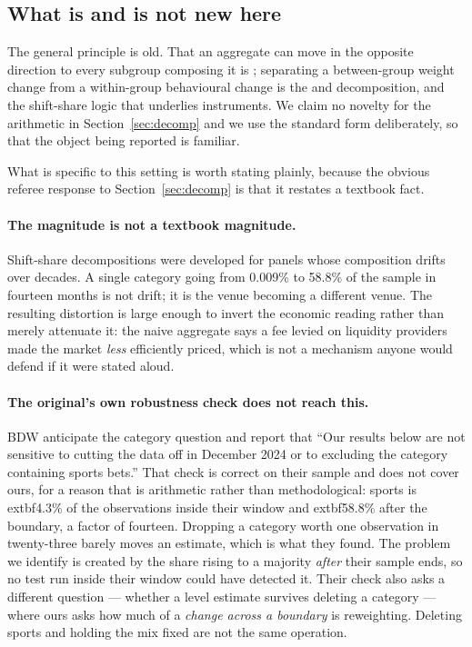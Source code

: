 \documentclass[preprint,12pt,authoryear]{elsarticle}
\begin{document}
\subsection{What is and is not new here}

The general principle is old. That an aggregate can move in the opposite
direction to every subgroup composing it is \citet{simpson1951}; separating a
between-group weight change from a within-group behavioural change is the
\citet{oaxaca1973} and \citet{blinder1973} decomposition, and the shift-share
logic that underlies \citet{bartik1991} instruments. We claim no novelty for the
arithmetic in Section~\ref{sec:decomp} and we use the standard form
deliberately, so that the object being reported is familiar.

What is specific to this setting is worth stating plainly, because the obvious
referee response to Section~\ref{sec:decomp} is that it restates a textbook
fact.

\paragraph{The magnitude is not a textbook magnitude.} Shift-share
decompositions were developed for panels whose composition drifts over decades.
A single category going from 0.009\% to 58.8\% of the sample in fourteen months
is not drift; it is the venue becoming a different venue. The resulting
distortion is large enough to invert the economic reading rather than merely
attenuate it: the naive aggregate says a fee levied on liquidity providers made
the market \emph{less} efficiently priced, which is not a mechanism anyone would
defend if it were stated aloud.

\paragraph{The original's own robustness check does not reach this.} BDW
anticipate the category question and report that ``Our results below are not
sensitive to cutting the data off in December 2024 or to excluding the category
containing sports bets.'' That check is correct on their sample and does not
cover ours, for a reason that is arithmetic rather than methodological: sports
is 	extbf{4.3\% of the observations inside their window} and 	extbf{58.8\%
after the boundary}, a factor of fourteen. Dropping a category worth one
observation in twenty-three barely moves an estimate, which is what they found.
The problem we identify is created by the share rising to a majority
\emph{after} their sample ends, so no test run inside their window could have
detected it. Their check also asks a different question --- whether a level
estimate survives deleting a category --- where ours asks how much of a
\emph{change across a boundary} is reweighting. Deleting sports and holding the
mix fixed are not the same operation.
\end{document}
